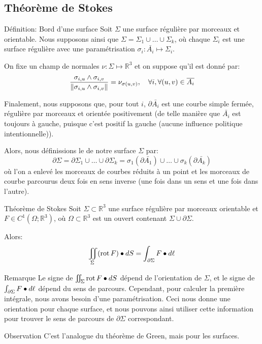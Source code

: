 \documentclass[a4paper]{article}
\begin{document}
\subsection{Théorème de Stokes}
\begin{parag}{Définition: Bord d'une surface}
    Soit $\Sigma$ une surface régulière par morceaux et orientable. Nous supposons ainsi que $\Sigma = \Sigma_1 \cup \ldots \cup \Sigma_k$, où chaque $\Sigma_i$ est une surface régulière avec une paramétrisation $\sigma_i : \bar{A_i} \mapsto \Sigma_i$.

    On fixe un champ de normales $\nu: \Sigma \mapsto \mathbb{R}^3$ et on suppose qu'il est donné par: 
    \[\frac{\sigma_{i, u}\wedge \sigma_{i, v}}{\left\|\sigma_{i, u} \wedge \sigma_{i, v}\right\|} = \nu_{\sigma\left(u, v\right)}, \mathspace \forall i, \forall \left(u, v\right) \in \bar{A_i}\]
    
    Finalement, nous supposons que, pour tout $i$, $\partial \bar{A_i}$ est une courbe simple fermée, régulière par morceaux et orientée positivement (de telle manière que $\bar{A_i}$ est toujours à gauche, puisque c'est positif la gauche (aucune influence politique intentionnelle)). 

    Alors, nous définissions le  de notre surface $\Sigma$ par: 
    \[\partial \Sigma = \partial \Sigma_1 \cup \ldots \cup \partial \Sigma_k = \sigma_1\left(\partial \bar{A_1}\right) \cup \ldots \cup \sigma_k\left(\partial \bar{A_k}\right)\]
    où l'on a enlevé les morceaux de courbes réduits à un point et les morceaux de courbe parcourus deux fois en sens inverse (une fois dans un sens et une fois dans l'autre).
\end{parag}
 

\begin{parag}{Théorème de Stokes}
    Soit $\Sigma \subset \mathbb{R}^3$ une surface régulière par morceaux orientable et $F \in C^1\left(\Omega; \mathbb{R}^3\right)$, où $\Omega \subset \mathbb{R}^3$ est un ouvert contenant $\Sigma \cup \partial \Sigma$.

    Alors: 
    \[\iint_{\Sigma} \left(\rot F\right) \dotprod dS = \int_{\partial \Sigma} F \dotprod d \ell \]

    \begin{subparag}{Remarque}
        Le signe de $\iint_{\Sigma} \operatorname{rot} F \bullet dS$ dépend de l'orientation de $\Sigma$, et le signe de $\int_{\partial \Sigma} F \bullet d \ell $ dépend du sens de parcours. Cependant, pour calculer la première intégrale, nous avons besoin d'une paramétrisation. Ceci nous donne une orientation pour chaque surface, et nous pouvons ainsi utiliser cette information pour trouver le sens de parcours de $\partial \Sigma$ correspondant.
    \end{subparag}
    
    \begin{subparag}{Observation}
        C'est l'analogue du théorème de Green, mais pour les surfaces.
    \end{subparag}
\end{parag}
\end{document}
